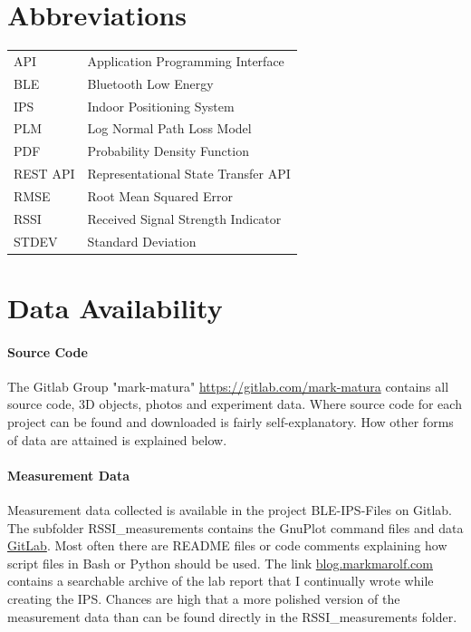 \documentclass[a4paper, oneside]{ipsreport}
\begin{document}
\chapter{Abbreviations}
\begin{tabular}{ll}
	API & Application Programming Interface \\
	BLE & Bluetooth Low Energy \\
	IPS & Indoor Positioning System \\
	PLM & Log Normal Path Loss Model \\
	PDF & Probability Density Function \\
	REST API &  Representational State Transfer API \\
	RMSE & Root Mean Squared Error \\
	RSSI & Received Signal Strength Indicator \\
	STDEV & Standard Deviation \\
\end{tabular}




\appendix
\chapter{Data Availability}

\subsubsection{Source Code}

The Gitlab Group "mark-matura" \href{https://gitlab.com/mark-matura}{https://gitlab.com/mark-matura} contains all source code, 3D objects, photos and experiment data. Where source code for each project can be found and downloaded is fairly self-explanatory. How other forms of data are attained is explained below.

\subsubsection{Measurement Data}
\label{appendix:rssimeasurementdata}
Measurement data collected is available in the project BLE-IPS-Files on Gitlab. The subfolder RSSI\_measurements contains the GnuPlot command files and data \href{https://gitlab.com/mark-matura/ble-ips-files/-/tree/master/RSSI_measurements}{GitLab}. Most often there are README files or code comments explaining how script files in Bash or Python should be used. The link \href{https://blog.markmarolf.com}{blog.markmarolf.com} contains a searchable archive of the lab report that I continually wrote while creating the IPS. Chances are high that a more polished version of the measurement data than can be found directly in the RSSI\_measurements folder.
\end{document}
